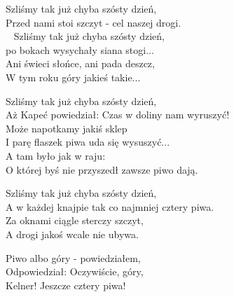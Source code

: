 \begin{text}
Szliśmy tak już chyba szósty dzień,\\
Przed nami stoi szczyt - cel naszej drogi.\\ 
Szliśmy tak już chyba szósty dzień,\\
po bokach wysychały siana stogi...\\
Ani świeci słońce, ani pada deszcz,\\
W tym roku góry jakieś takie... 

Szliśmy tak już chyba szósty dzień,\\
Aż Kapeć powiedział: Czas w doliny nam wyruszyć!\\
Może napotkamy jakiś sklep\\
I parę flaszek piwa uda się wysuszyć...\\

A tam było jak w raju:\\
O której byś nie przyszedł zawsze piwo dają.

Szliśmy tak już chyba szósty dzień,\\
A w każdej knajpie tak co najmniej cztery piwa.\\
Za oknami ciągle sterczy szczyt,\\
A drogi jakoś wcale nie ubywa.

Piwo albo góry - powiedziałem,\\
Odpowiedział: Oczywiście, góry,\\
Kelner! Jeszcze cztery piwa!
\end{text}